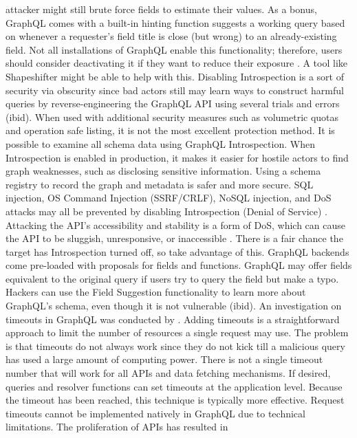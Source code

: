 attacker might still brute force fields to estimate their values. As a bonus,
GraphQL comes with a built-in hinting function suggests a working query based on
whenever a requester's field title is close (but wrong) to an already-existing
field. Not all installations of GraphQL enable this functionality; therefore,
users should consider deactivating it if they want to reduce their exposure
\citep{kouraiSecureOffloadingLegacy2016}. A tool like Shapeshifter might be able
to help with this. Disabling Introspection is a sort of security via obscurity
since bad actors still may learn ways to construct harmful queries by
reverse-engineering the GraphQL API using several trials and errors (ibid). When
used with additional security measures such as volumetric quotas and operation
safe listing, it is not the most excellent protection method. It is possible to
examine all schema data using GraphQL Introspection. When Introspection is
enabled in production, it makes it easier for hostile actors to find graph
weaknesses, such as disclosing sensitive information. Using a schema registry to
record the graph and metadata is safer and more secure. SQL injection, OS
Command Injection (SSRF/CRLF), NoSQL injection, and DoS attacks may all be
prevented by disabling Introspection (Denial of Service) \citep{
eizingerAPIDesignDistributed2017}. Attacking the API's accessibility and
stability is a form of DoS, which can cause the API to be sluggish, unresponsive,
or inaccessible \citep{gozneliIdentificationEvaluationProcess2020}. There is a
fair chance the target has Introspection turned off, so take advantage of this.
GraphQL backends come pre-loaded with proposals for fields and functions.
GraphQL may offer fields equivalent to the original query if users try to query
the field but make a typo. Hackers can use the Field Suggestion functionality to
learn more about
GraphQL's schema, even though it is not vulnerable (ibid). An investigation on
timeouts in GraphQL was conducted by \citet{ witternEmpiricalStudyGraphQL2019}.
Adding timeouts is a straightforward approach to limit the number of resources a
single request may use. The problem is that timeouts do not always work since
they do not kick till a malicious query has used a large amount of computing
power. There is not a single timeout number that will work for all APIs and data
fetching mechanisms. If desired, queries and resolver functions can set timeouts
at the application level. Because the timeout has been reached, this technique
is typically more effective. Request timeouts cannot be implemented natively in
GraphQL due to technical limitations. The proliferation of APIs has resulted in
